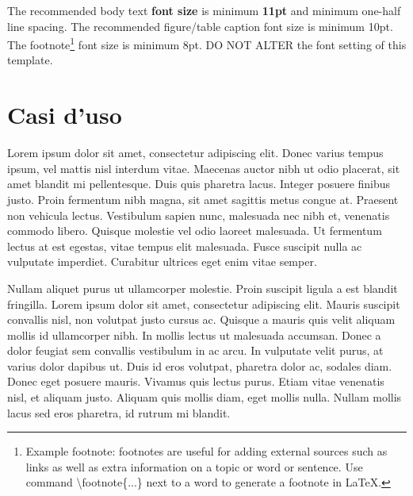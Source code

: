 The recommended body text \textbf{font size} is minimum \textbf{11pt} and minimum one-half line spacing. The recommended figure/table caption font size is minimum 10pt. The footnote\footnote{Example footnote: footnotes are useful for adding external sources such as links as well as extra information on a topic or word or sentence. Use command \textbackslash footnote\{...\} next to a word to generate a footnote in \LaTeX.} font size is minimum 8pt. DO NOT ALTER the font setting of this template.   

\section{Casi d'uso}
\label{sec:use_case}

Lorem ipsum dolor sit amet, consectetur adipiscing elit. Donec varius tempus ipsum, vel mattis nisl interdum vitae. Maecenas auctor nibh ut odio placerat, sit amet blandit mi pellentesque. Duis quis pharetra lacus. Integer posuere finibus justo. Proin fermentum nibh magna, sit amet sagittis metus congue at. Praesent non vehicula lectus. Vestibulum sapien nunc, malesuada nec nibh et, venenatis commodo libero. Quisque molestie vel odio laoreet malesuada. Ut fermentum lectus at est egestas, vitae tempus elit malesuada. Fusce suscipit nulla ac vulputate imperdiet. Curabitur ultrices eget enim vitae semper.

Nullam aliquet purus ut ullamcorper molestie. Proin suscipit ligula a est blandit fringilla. Lorem ipsum dolor sit amet, consectetur adipiscing elit. Mauris suscipit convallis nisl, non volutpat justo cursus ac. Quisque a mauris quis velit aliquam mollis id ullamcorper nibh. In mollis lectus ut malesuada accumsan. Donec a dolor feugiat sem convallis vestibulum in ac arcu. In vulputate velit purus, at varius dolor dapibus ut. Duis id eros volutpat, pharetra dolor ac, sodales diam. Donec eget posuere mauris. Vivamus quis lectus purus. Etiam vitae venenatis nisl, et aliquam justo. Aliquam quis mollis diam, eget mollis nulla. Nullam mollis lacus sed eros pharetra, id rutrum mi blandit.


